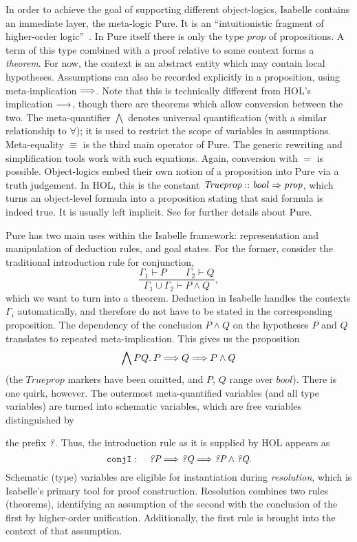 In order to achieve the goal of supporting different object-logics,
Isabelle contains an immediate layer, the meta-logic Pure.
It is an ``intuitionistic fragment of higher-order logic''~\cite[27]{isar-ref}.
In Pure itself there is only the type $\mathit{prop}$ of propositions.
A term of this type combined with a proof relative to some context forms a
\emph{theorem}.
For now, the context is an abstract entity which may contain local hypotheses.
Assumptions can also be recorded explicitly in a proposition, using
meta-implication $\Longrightarrow$.
Note that this is technically different from HOL's implication $\longrightarrow$,
though there are theorems which allow conversion between the two.
The meta-quantifier $\bigwedge$ denotes universal quantification (with a
similar relationship to $\forall$); it is used to restrict the scope of
variables in assumptions.
Meta-equality $\equiv$ is the third main operator of Pure.
The generic rewriting and simplification tools work with such equations.
Again, conversion with $=$ is possible.
Object-logics embed their own notion of a proposition into Pure via
a truth judgement.
In HOL, this is the constant $\mathit{Trueprop} \mathrel{::} \mathit{bool \Rightarrow prop}$,
which turns an object-level formula into a proposition stating that said
formula is indeed true.
It is usually left implicit.
See \cite[Chapter~2]{implementation-ref} for further details about Pure.

Pure has two main uses within the Isabelle framework: representation and
manipulation of deduction rules, and goal states.
For the former, consider the traditional introduction rule for conjunction,
\[ \frac{\Gamma_1 \vdash P \qquad \Gamma_2 \vdash Q}{\Gamma_1 \cup \Gamma_2 \vdash P \land Q}, \]
which we want to turn into a theorem.
Deduction in Isabelle handles the contexts $\Gamma_i$ automatically, and
therefore do not have to be stated in the corresponding proposition.
The dependency of the conclusion $P \land Q$ on the hypotheses $P$ and $Q$
translates to repeated meta-implication.
This gives us the proposition
\[ \bigwedge P Q.\>P \Longrightarrow Q \Longrightarrow P \land Q \]
(the $\mathit{Trueprop}$ markers have been omitted, and $P$, $Q$ range over
$\mathit{bool}$).
There is one quirk, however.
The outermost meta-quantified variables (and all type variables) %
are turned into schematic variables, which are free variables distinguished by

the prefix $\textit{?}$.
Thus, the introduction rule as it is supplied by HOL appears as
\[ \mathtt{conjI}:\quad \textit{?P} \Longrightarrow \textit{?Q} \Longrightarrow \textit{?P} \land \textit{?Q}. \]
Schematic (type) variables are eligible for instantiation during
\emph{resolution}, which is Isabelle's primary tool for proof construction.
Resolution combines two rules (theorems), identifying an assumption of the
second with the conclusion of the first by higher-order unification.
Additionally, the first rule is brought into the context of that assumption.

